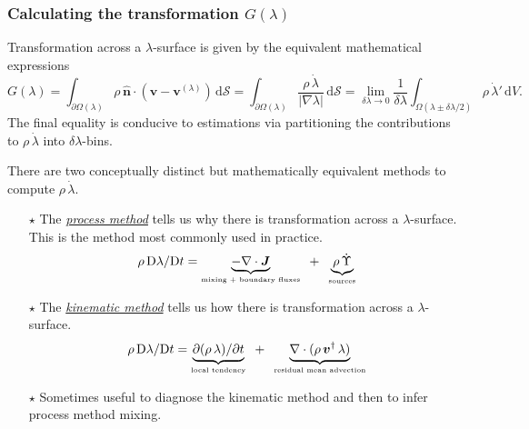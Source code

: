 \documentclass[10pt]{beamer}
\begin{document}
\begin{frame}
  \frametitle{Calculating the transformation $G(\lambda)$}
\scriptsize 
 
\begin{exampleblock}{}

Transformation across a $\lambda$-surface is given by the equivalent
mathematical expressions
\begin{equation*}
 G(\lambda) 
 = \int_{\partial \Omega(\lambda) } \rho \,  \hat{\bm n} \cdot ({\bm v} -{\bm v}^{(\lambda)} )   \, \mathrm{d}\mathcal{S}
 = \int_{\partial \Omega(\lambda)} \frac{\rho \, \dot{\lambda}}{|\nabla \lambda|} \, \mathrm{d}\mathcal{S}
 = \lim_{\delta \lambda \rightarrow 0}
 \frac{1}{\delta \lambda}
 \int_{\Omega(\lambda \pm \delta \lambda/2)} \rho \, \dot{\lambda}' \, \mathrm{d}V.
\end{equation*}
The final equality is conducive to estimations via partitioning the
contributions to $\rho \, \dot{\lambda}$ into $\delta \lambda$-bins.

\end{exampleblock}

There are two conceptually distinct but mathematically equivalent
methods to compute $\rho \, \dot{\lambda}$.
\begin{itemize}

\item[$\star$] The \underline{\it process method} tells us why there is
  transformation across a $\lambda$-surface.  This is the method most
  commonly used in practice.
\begin{equation*}
 \rho \, \mathrm{D}\lambda/ \mathrm{D}t 
   = \underbrace{-\nabla \cdot {\bm J}}_{\mbox{\tiny mixing + boundary fluxes}} \; \; 
   + \; \; \underbrace{\rho \, \dot{\Upsilon}}_{\mbox{\tiny sources}}
\end{equation*}

\item[$\star$] The \underline{\it kinematic method} tells us how there is
  transformation across a $\lambda$-surface.
\begin{equation*}
 \rho \, \mathrm{D}\lambda/\mathrm{D}t 
 = \underbrace{\partial (\rho \, \lambda)/\partial t}_{\mbox{\tiny local tendency}}
  \; \; 
  + 
 \; \;  \underbrace{\nabla \cdot (\rho \, {\bm v}^{\dagger} \, \lambda)}_{\mbox{\tiny residual mean advection}} 
\end{equation*}
 
\item[$\star$] Sometimes useful to diagnose the kinematic method and
  then to infer process method mixing.
 

\end{itemize}
\end{frame}
\end{document}
